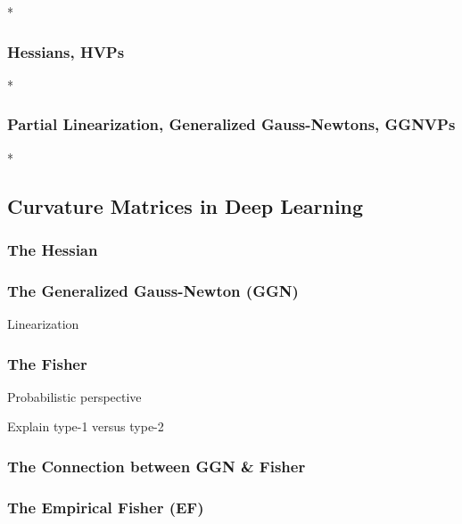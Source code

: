 \switchcolumn[0]*
\subsubsection{Hessians, HVPs}


\switchcolumn[0]*
\subsubsection{Partial Linearization, Generalized Gauss-Newtons, GGNVPs}


\switchcolumn[0]*
\subsection{Curvature Matrices in Deep Learning}
\subsubsection{The Hessian}

\subsubsection{The Generalized Gauss-Newton (GGN)}
Linearization

\subsubsection{The Fisher}
Probabilistic perspective

Explain type-1 versus type-2
\subsubsection{The Connection between GGN \& Fisher}
\subsubsection{The Empirical Fisher (EF)}

